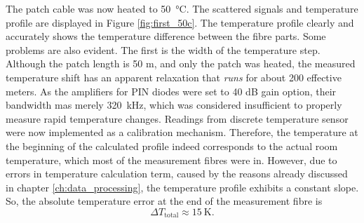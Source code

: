 \documentclass{standalone}
\begin{document}
The patch cable was now heated to \SI{50}{\celsius}. The scattered signals and temperature profile are displayed in Figure \ref{fig:first_50c}.
The temperature profile clearly and accurately shows the temperature difference between the fibre parts. Some problems are also evident. The first is the width of the temperature step. Although the patch length is 50 m, and only the patch was heated, the measured temperature shift has an apparent relaxation that \textit{runs} for about 200 effective meters. As the amplifiers for PIN diodes were set to 40 dB gain option, their bandwidth mas merely \SI{320}{\kilo \hertz}, which was considered insufficient to properly measure rapid temperature changes. Readings from discrete temperature sensor were now implemented as a calibration mechanism. Therefore, the temperature at the beginning of the calculated profile indeed corresponds to the actual room temperature, which most of the measurement fibres were in. However, due to errors in temperature calculation term, caused by the reasons already discussed in chapter \ref{ch:data_processing}, the temperature profile exhibits a constant slope. So, the absolute temperature error at the end of the measurement fibre is 
\begin{equation}
\varDelta T_\textrm{total} \approx \SI{15}{\kelvin} \textrm{.}
\end{equation}







\setcounter{stranica}{\thepage}
\addtocounter{stranica}{1}
\end{document}
